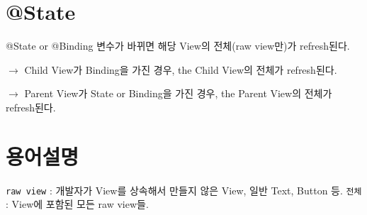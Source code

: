 \documentclass{article}
\begin{document}
\section{@State}
@State or @Binding 변수가 바뀌면 해당 View의 전체(raw view만)가 refresh된다.

$\rightarrow$ Child View가 Binding을 가진 경우, the Child View의 전체가 refresh된다. 

$\rightarrow$ Parent View가 State or Binding을 가진 경우, the Parent View의 전체가 refresh된다. 

\section{용어설명}
\texttt{raw view} : 개발자가 View를 상속해서 만들지 않은 View, 일반 Text, Button 등.
\texttt{전체} : View에 포함된 모든 raw view들. 
\end{document}
